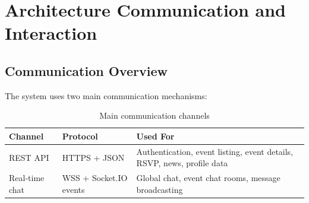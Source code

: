 \documentclass[12pt,a4paper]{article}
\begin{document}
\section{Architecture Communication and Interaction}
\subsection{Communication Overview}
The system uses two main communication mechanisms:
\begin{table}[H]
\centering
\caption{Main communication channels}
\begin{tabularx}{\textwidth}{@{}l l X@{}}
\toprule
\textbf{Channel} & \textbf{Protocol} & \textbf{Used For} \\
\midrule
REST API & HTTPS + JSON & Authentication, event listing, event details, RSVP, news, profile data \\
Real-time chat & WSS + Socket.IO events & Global chat, event chat rooms, message broadcasting \\
\bottomrule
\end{tabularx}
\end{table}
\end{document}

